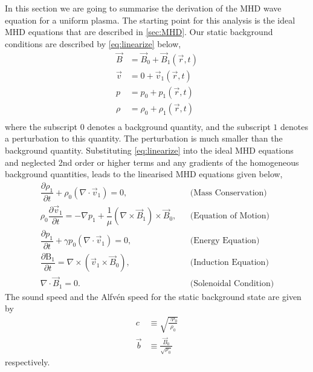 In this section we are going to summarise the derivation of the MHD wave equation for a uniform plasma.
The starting point for this analysis is the ideal MHD equations that are described in \cref{sec:MHD}.
Our static background conditions are described by \cref{eq:linearize} below,
\begin{equation}\label{eq:linearize}
    \begin{aligned}                                                    
        \vec{B} &= \vec{B}_0 + \vec{B}_1(\vec{r},t)\\
        \vec{v} &= 0 + \vec{v}_1(\vec{r},t)\\
        p &= p_0 + {p_1}(\vec{r},t)\\
        \rho &= \rho_0 + {\rho_1}(\vec{r},t)\\
    \end{aligned}
\end{equation}
where the subscript $0$ denotes a background quantity, and the subscript $1$ denotes a perturbation to this quantity.
The perturbation is much smaller than the background quantity.
Substituting \cref{eq:linearize} into the ideal MHD equations and neglected 2nd order or higher terms and any gradients of the homogeneous background quantities, leads to the linearised MHD equations given below,
\begin{align}                                                         
    \dfrac{\partial \rho_1 }{\partial t} + \rho_0 (\nabla \cdot \vec{v}_1) =       
    0,
    &&\text{(Mass Conservation)}\label{eq:lmhd_mass}\\
    \rho_0 \dfrac{\partial \vec{v}_1}{\partial t} =
    -\nabla p_1 + \dfrac{1}{\mu}(\nabla \times \vec{B}_1) \times \vec{B}_0,
    &&\text{(Equation of Motion)}\label{eq:lmhd_motion}\\
    \dfrac{\partial p_1}{\partial t} + \gamma p_0 \left( \nabla \cdot \vec{v}_1 \right) = 0,
    &&\text{(Energy Equation)}\label{eq:lmhd_energy}\\
    \dfrac{\partial \mathrm{B}_1}{\partial t} = \nabla \times (\vec{v}_1 \times \vec{B}_0),
    &&\text{(Induction Equation)}\label{eq:lmhd_induction}\\
    \nabla \cdot \vec{B}_1 = 0.
    &&\text{(Solenoidal Condition)}\label{eq:lmhd_solenoid}              
\end{align}
The sound speed and the Alfv\'en speed for the static background state are given by 
\begin{align}
    c &\equiv \sqrt{\frac{\gamma p_0}{\rho_0}}\label{eq:soundspeed}\\
    \vec{b} &\equiv \frac{\vec{B}_0}{\sqrt{\rho_0}}\label{eq:alfvenspeed}
\end{align}
respectively.

